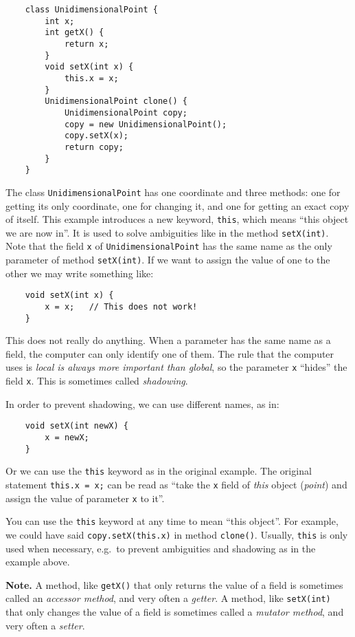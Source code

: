 \begin{verbatim}
    class UnidimensionalPoint {
        int x;
        int getX() {
            return x;
        }
        void setX(int x) {
            this.x = x;
        }
        UnidimensionalPoint clone() {
            UnidimensionalPoint copy;
            copy = new UnidimensionalPoint();
            copy.setX(x);
            return copy;
        }
    }
\end{verbatim}

The class \verb+UnidimensionalPoint+ has one coordinate and three
methods: one for getting its only coordinate, one for changing it, and
one for getting an exact copy of itself. This example introduces a new
keyword, \verb+this+, which means ``this object we are now in''. It is
used to solve ambiguities like in the method \verb+setX(int)+. Note
that the field \verb+x+ of \verb+UnidimensionalPoint+ has the same
name as the only parameter of method \verb+setX(int)+. If we want to
assign the value of one to the other we may write something like: 

\begin{verbatim}
    void setX(int x) {
        x = x;   // This does not work!
    }
\end{verbatim}

This does not really do anything. When a parameter has the same name
as a field, the computer can only identify one of them. The rule that
the computer uses is \emph{local is always more important than
  global}, so the parameter \verb+x+ ``hides'' the field
\verb+x+. This is sometimes called \emph{shadowing}. 

In order to prevent shadowing, we can use different names, as in: 

\begin{verbatim}
    void setX(int newX) {
        x = newX;
    }
\end{verbatim}

Or we can use the \verb+this+ keyword as in the original example. The
original statement \verb+this.x = x;+ can be read as ``take the
\verb+x+ field of \emph{this} object (\emph{point}) and
assign the value of parameter \verb+x+ to it''. 

You can use the \verb+this+ keyword at any time to mean ``this
object''. For example, we could have said \verb+copy.setX(this.x)+ in
method \verb+clone()+. Usually, \verb+this+ is only used when necessary,
e.g.~to prevent ambiguities and shadowing as in the example above. 

\textbf{Note.} A method, like \verb+getX()+ that only returns the
value of a field is 
sometimes called an \emph{accessor method}, and very often a
\emph{getter}. A method, 
like \verb+setX(int)+ that only changes the
value of a field is 
sometimes called a \emph{mutator method}, and very often a
\emph{setter}. 


